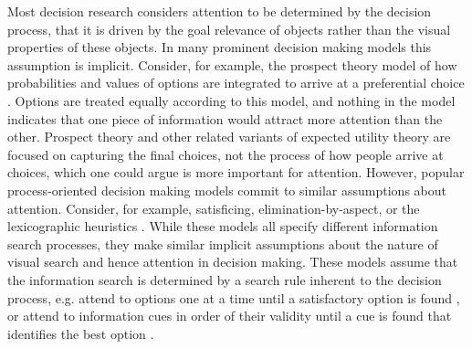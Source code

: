 \documentclass{article}
\begin{document}
Most decision research considers attention to be determined by the decision process, that it is driven by the goal relevance of objects rather than the visual properties of these objects. In many prominent decision making models this assumption is implicit. Consider, for example, the prospect theory model of how probabilities and values of options are integrated  to arrive at a preferential choice \citep{tversky1979}. Options are treated equally according to this model, and nothing in the model indicates that one piece of information would attract more attention than the other. Prospect theory and other related variants of expected utility theory are focused on capturing the final choices, not the process of how people arrive at choices, which one could argue is more important for attention. However, popular process-oriented decision making models commit to similar assumptions about attention. Consider, for example, satisficing, elimination-by-aspect, or the lexicographic heuristics \citep{payne1988, simon1956a}. While these models all specify different information search processes, they make similar implicit assumptions about the nature of visual search and hence attention in decision making. These  models assume that the information search is determined by a search rule inherent to the decision process, e.g. attend to options one at a time until a satisfactory option is found \citep{stuttgen2012}, or attend to information cues in order of their validity until a cue is found that identifies the best option \citep{krefeld-schwalb2019a}. 
\end{document}
